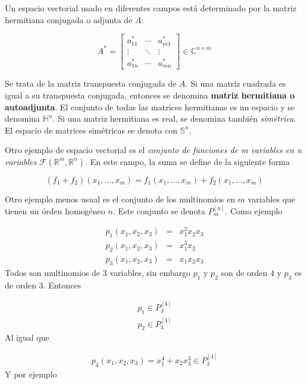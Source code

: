 Un espacio vectorial usado en diferentes campos está determinado por la matriz hermitiana conjugada o adjunta de $A$:

\begin{equation*}
A^{\ast} = \left[  \begin{array}{ccc}
    a_{11}^{*} & \cdots & a_{m1}^{*} \\
    \vdots & \ddots & \vdots \\
    a_{1n}^{*} & \cdots & a_{mn}^{*} 
\end{array}\right] \in \mathbb{C}^{n \times m}
\end{equation*}

Se trata de la matriz transpuesta conjugada de $A$.  Si una matriz cuadrada es igual a su transpuesta conjugada, entonces se denomina \textbf{matriz hermitiana o autoadjunta}. 
El conjunto de todas las matrices hermitianas es un espacio y se denomina $\mathbb{H}^n$.  Si una matriz hermitiana es real, se denomina también \textit{simétrica}. El espacio de matrices simétricas se denota con $\mathbb{S}^n$. 

Otro ejemplo de espacio vectorial es el \textit{conjunto de funciones de m variables en n variables} $\mathcal{F}(\mathbb{R}^m,\mathbb{R}^n)$. En este campo, la suma se define de la siguiente forma

\begin{equation*}
(f_1+f_2)(x_1,...,x_m) = f_1(x_1,...,x_m) + f_2(x_1,...,x_m)
\end{equation*}

Otro ejemplo menos usual es el conjunto de los multinomios en $m$ variables que tienen un órden homogéneo $n$. Este conjunto se denota $P_{m}^{[n]}$. Como ejemplo

\begin{eqnarray*}
p_1(x_1,x_2,x_3) &=& x_1^2 x_2 x_3 \\
p_2(x_1,x_2,x_3) &=& x_1^3 x_2 \\
p_3(x_1,x_2,x_3) &=& x_1 x_2 x_3 
\end{eqnarray*}
Todos son multinomios de $3$ variables, sin embargo $p_1$ y $p_2$ son de orden $4$ y $p_3$ es de orden $3$. Entonces 


\begin{eqnarray*}
p_1 \in P_{3}^{[4]} \\
p_2 \in P_{3}^{[4]}
\end{eqnarray*}
Al igual que 

\begin{eqnarray*}
p_4(x_1,x_2,x_3) = x_1^4+x_2 x_3^3 \in P_{3}^{[4]}
\end{eqnarray*}
Y por ejemplo

